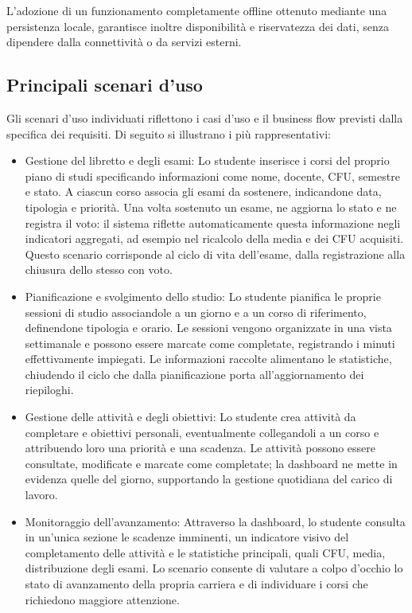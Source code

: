 \documentclass[a4paper, 12pt]{article}
\begin{document}
L'adozione di un funzionamento completamente offline ottenuto mediante una persistenza locale, garantisce inoltre disponibilità e riservatezza dei dati, senza dipendere dalla connettività o da servizi esterni.


\subsection{Principali scenari d'uso}
Gli scenari d'uso individuati riflettono i casi d'uso e il business flow previsti dalla specifica dei requisiti. 
Di seguito si illustrano i più rappresentativi:
\begin{itemize}
    \item Gestione del libretto e degli esami: Lo studente inserisce i corsi del proprio piano di studi specificando informazioni come nome, docente, CFU, semestre e stato. A ciascun corso associa gli esami da sostenere, indicandone data, tipologia e priorità. Una volta sostenuto un esame, ne aggiorna lo stato e ne registra il voto: il sistema riflette automaticamente questa informazione negli indicatori aggregati, ad esempio nel ricalcolo della media e dei CFU acquisiti. Questo scenario corrisponde al ciclo di vita dell'esame, dalla registrazione alla chiusura dello stesso con voto.
    \item Pianificazione e svolgimento dello studio: Lo studente pianifica le proprie sessioni di studio associandole a un giorno e a un corso di riferimento, definendone tipologia e orario. Le sessioni vengono organizzate in una vista settimanale e possono essere marcate come completate, registrando i minuti effettivamente impiegati. Le informazioni raccolte alimentano le statistiche, chiudendo il ciclo che dalla pianificazione porta all'aggiornamento dei riepiloghi.
    \item Gestione delle attività e degli obiettivi: Lo studente crea attività da completare e obiettivi personali, eventualmente collegandoli a un corso e attribuendo loro una priorità e una scadenza. Le attività possono essere consultate, modificate e marcate come completate; la dashboard ne mette in evidenza quelle del giorno, supportando la gestione quotidiana del carico di lavoro.
    \item Monitoraggio dell'avanzamento: Attraverso la dashboard, lo studente consulta in un'unica sezione le scadenze imminenti, un indicatore visivo del completamento delle attività e le statistiche principali, quali CFU, media, distribuzione degli esami. Lo scenario consente di valutare a colpo d'occhio lo stato di avanzamento della propria carriera e di individuare i corsi che richiedono maggiore attenzione.

\end{itemize}
\end{document}

